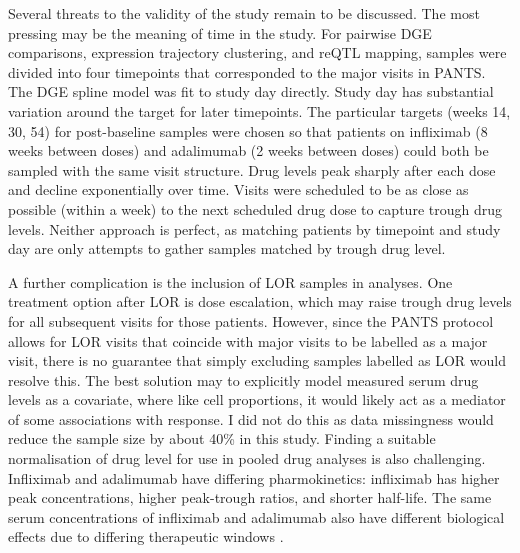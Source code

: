 Several threats to the validity of the study remain to be discussed.
The most pressing may be the meaning of time in the study.
For pairwise \gls{DGE} comparisons, expression trajectory clustering, and \gls{reQTL} mapping, 
samples were divided into four timepoints that corresponded to the major visits in \gls{PANTS}.
The \gls{DGE} spline model was fit to study day directly.
Study day has substantial variation around the target for later timepoints.
The particular targets (weeks 14, 30, 54) for post-baseline samples were chosen so that patients on infliximab (8 weeks between doses) and adalimumab (2 weeks between doses) could both be sampled with the same visit structure.
Drug levels peak sharply after each dose and decline exponentially over time.
Visits were scheduled to be as close as possible (within a week) to the next scheduled drug dose to capture trough drug levels.
Neither approach is perfect, as matching patients by timepoint and study day are only attempts to gather samples matched by trough drug level.

A further complication is the inclusion of \gls{LOR} samples in analyses.
One treatment option after \gls{LOR} is dose escalation, which may raise trough drug levels for all subsequent visits for those patients.
However, since the \gls{PANTS} protocol allows for \gls{LOR} visits that coincide with major visits to be labelled as a major visit,
there is no guarantee that simply excluding samples labelled as \gls{LOR} would resolve this.
%
The best solution may to explicitly model measured serum drug levels as a covariate, where like cell proportions, it would likely act as a mediator of some associations with response.
I did not do this as data missingness would reduce the sample size by about 40\% in this study.
Finding a suitable normalisation of drug level for use in pooled drug analyses is also challenging.
Infliximab and adalimumab have differing pharmokinetics: infliximab has higher peak concentrations, higher peak-trough ratios, and shorter half-life.
The same serum concentrations of infliximab and adalimumab also have different biological effects due to differing therapeutic windows
 \autocite{tracey2008TumorNecrosisFactor,lichtenstein2013ComprehensiveReviewAntitumor,gibson2020ReviewArticleDetermination}.

